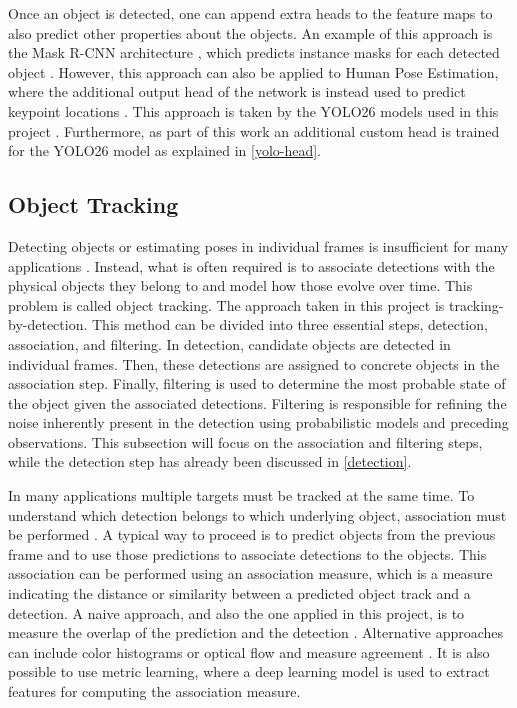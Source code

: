 Once an object is detected, one can append extra heads to the feature maps to also predict other properties about the objects. An example of this approach is the Mask R-CNN architecture \parencite{he2017mask}, which predicts instance masks for each detected object \parencite{Lanz2026Notes}. However, this approach can also be applied to Human Pose Estimation, where the additional output head of the network is instead used to predict keypoint locations \parencite{maji2022yolo}. This approach is taken by the YOLO26 models used in this project \parencite{ultralyticsYOLO,sapkota2025yolo26,sapkota2025ultralytics}. Furthermore, as part of this work an additional custom head is trained for the YOLO26 model as explained in \cref{yolo-head}.


\subsection{Object Tracking} \label{tracking}

Detecting objects or estimating poses in individual frames is insufficient for many applications \parencite{Lanz2026Notes}. Instead, what is often required is to associate detections with the physical objects they belong to and model how those evolve over time. This problem is called object tracking. The approach taken in this project is tracking-by-detection. This method can be divided into three essential steps, detection, association, and filtering. In detection, candidate objects are detected in individual frames. Then, these detections are assigned to concrete objects in the association step. Finally, filtering is used to determine the most probable state of the object given the associated detections. Filtering is responsible for refining the noise inherently present in the detection using probabilistic models and preceding observations. This subsection will focus on the association and filtering steps, while the detection step has already been discussed in \cref{detection}.

In many applications multiple targets must be tracked at the same time. To understand which detection belongs to which underlying object, association must be performed \parencite{Lanz2026Notes}. A typical way to proceed is to predict objects from the previous frame and to use those predictions to associate detections to the objects. This association can be performed using an association measure, which is a measure indicating the distance or similarity between a predicted object track and a detection. A naive approach, and also the one applied in this project, is to measure the overlap of the prediction and the detection \parencite{bewley2016simple}. Alternative approaches can include color histograms or optical flow and measure agreement \parencite{Lanz2026Notes}. It is also possible to use metric learning, where a deep learning model is used to extract features for computing the association measure.

